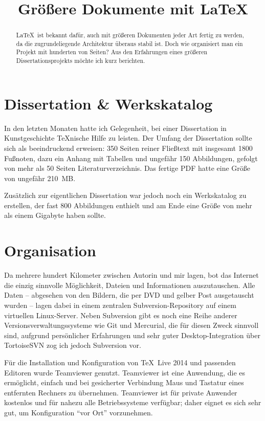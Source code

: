 \documentclass[12pt,ngerman]{dtk}
\title{Größere Dokumente mit \LaTeX}
\begin{document}
\maketitle

\begin{abstract}
\LaTeX\ ist bekannt dafür, auch mit größeren Dokumenten jeder Art fertig zu werden, da die zugrundeliegende Architektur überaus stabil ist. Doch wie organisiert man ein Projekt mit hunderten von Seiten? Aus den Erfahrungen eines größeren Dissertationsprojekts möchte ich kurz berichten.
\end{abstract}

\section{Dissertation \& Werkskatalog}

In den letzten Monaten hatte ich Gelegenheit, bei einer Dissertation in Kunstgeschichte \TeX nische Hilfe zu leisten. Der Umfang der Dissertation sollte sich als beeindruckend erweisen: 350 Seiten reiner Fließtext mit insgesamt 1800 Fußnoten, dazu ein Anhang mit Tabellen und ungefähr 150 Abbildungen, gefolgt von mehr als 50 Seiten Literaturverzeichnis. Das fertige PDF hatte eine Größe von ungefähr 210~MB.

Zusätzlich zur eigentlichen Dissertation war jedoch noch ein Werkskatalog zu erstellen, der fast 800 Abbildungen enthielt und am Ende eine Größe von mehr als einem Gigabyte haben sollte.

\section{Organisation}

Da mehrere hundert Kilometer zwischen Autorin und mir lagen, bot das Internet die einzig sinnvolle Möglichkeit, Dateien und Informationen auszutauschen. Alle Daten -- abgesehen von den Bildern, die per DVD und gelber Post ausgetauscht wurden -- lagen dabei in einem zentralen Subversion-Repository auf einem virtuellen Linux-Server. Neben Subversion gibt es noch eine Reihe anderer Versionsverwaltungssysteme wie Git und Mercurial, die für diesen Zweck sinnvoll sind, aufgrund persönlicher Erfahrungen und sehr guter Desktop-Integration über TortoiseSVN zog ich jedoch Subversion vor. 

Für die Installation und Konfiguration von \TeX\ Live 2014 und passenden Editoren wurde Teamviewer genutzt. Teamviewer ist eine Anwendung, die es ermöglicht, einfach und bei gesicherter Verbindung Maus und Tastatur eines entfernten Rechners zu übernehmen. Teamviewer ist für private Anwender kostenlos und für nahezu alle Betriebssysteme verfügbar; daher eignet es sich sehr gut, um Konfiguration \enquote{vor Ort} vorzunehmen.
\end{document}

